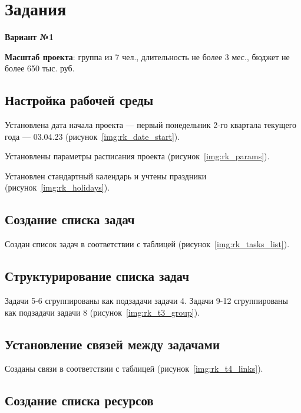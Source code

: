 \chapter{Задания}

\textbf{Вариант №1}

\textbf{Масштаб проекта}: группа из 7 чел., длительность не более 3 мес., бюджет не более 650 тыс. руб.

\section{Настройка рабочей среды}

Установлена дата начала проекта --- первый понедельник 2-го квартала текущего года --- 03.04.23 (рисунок~\ref{img:rk_date_start}).

Установлены параметры расписания проекта (рисунок~\ref{img:rk_params}).

Установлен стандартный календарь и учтены праздники (рисунок~\ref{img:rk_holidays}).

\section{Создание списка задач}

Создан список задач в соответствии с таблицей (рисунок~\ref{img:rk_tasks_list}).

\section{Структурирование списка задач}

Задачи 5-6 сгруппированы как подзадачи задачи 4. Задачи 9-12 сгруппированы как подзадачи задачи 8 (рисунок~\ref{img:rk_t3_group}).

\section{Установление связей между задачами}

Созданы связи в соответствии с таблицей (рисунок~\ref{img:rk_t4_links}).

\newpage
\section{Создание списка ресурсов}

